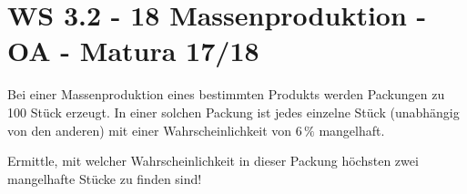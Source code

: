 \section{WS 3.2 - 18 Massenproduktion - OA - Matura 17/18}

\begin{beispiel}[WS 3.2]{1} %
Bei einer Massenproduktion eines bestimmten Produkts werden Packungen zu 100 Stück erzeugt. In einer solchen Packung ist jedes einzelne Stück (unabhängig von den anderen) mit einer Wahrscheinlichkeit von $6\,\%$ mangelhaft.

Ermittle, mit welcher Wahrscheinlichkeit in dieser Packung höchsten zwei mangelhafte Stücke zu finden sind!\leer

\end{beispiel}